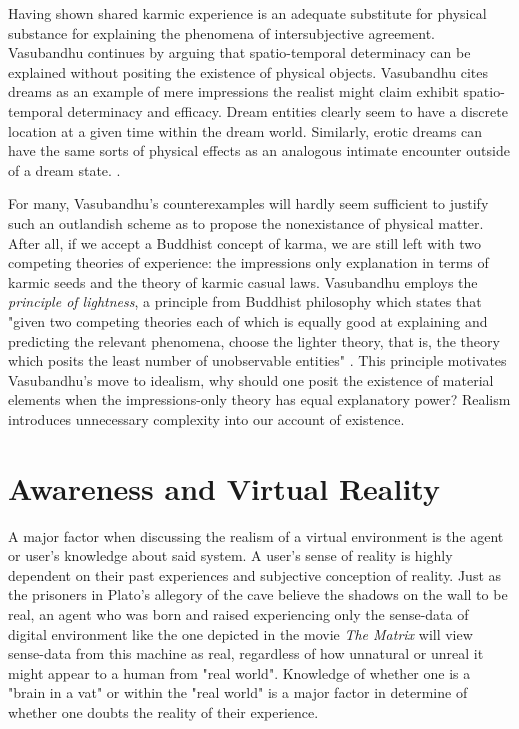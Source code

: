  Having shown shared karmic experience is an adequate substitute for physical substance for explaining the phenomena of intersubjective agreement.  Vasubandhu continues by arguing that spatio-temporal determinacy can be explained without positing the existence of physical objects. Vasubandhu cites dreams as an example of mere impressions the realist might claim exhibit spatio-temporal determinacy and efficacy. Dream entities clearly seem to have a discrete location at a given time within the dream world. Similarly, erotic dreams can have the same sorts of physical effects as an analogous intimate encounter outside of a dream state. \cite{siderits2007buddhism}.
 \newline
 
 For many, Vasubandhu's counterexamples will hardly seem sufficient to justify such an outlandish scheme as to propose the nonexistance of physical matter. After all, if we accept a Buddhist concept of karma, we are still left with two competing theories of experience: the impressions only explanation in terms of karmic seeds and the theory of karmic casual laws. \cite{siderits2007buddhism} Vasubandhu employs the \textit{principle of lightness}, a principle from Buddhist philosophy which states that "given two competing theories each of which is equally good at explaining and predicting the relevant phenomena, choose the lighter theory, that is, the theory which posits the least number of unobservable entities" \cite{siderits2007buddhism}. This principle motivates Vasubandhu's move to idealism, why should one posit the existence of material elements when the impressions-only theory has equal explanatory power? Realism introduces unnecessary complexity into our account of existence.  



  \section{Awareness and Virtual Reality}
A major factor when discussing the realism of a virtual environment is the agent or user's knowledge about said system. A user's sense of reality is highly dependent on their past experiences and subjective conception of reality. Just as the prisoners in Plato's  allegory of the cave believe the shadows on the wall to be real, an agent who was born and raised experiencing only the sense-data of digital environment like the one depicted in the movie \textit{The Matrix} will view sense-data from this machine as real, regardless of how unnatural or unreal it might appear to a human from "real world". Knowledge of whether one is a "brain in a vat" or within the "real world" is a major factor in determine of whether one doubts the reality of their experience. 
